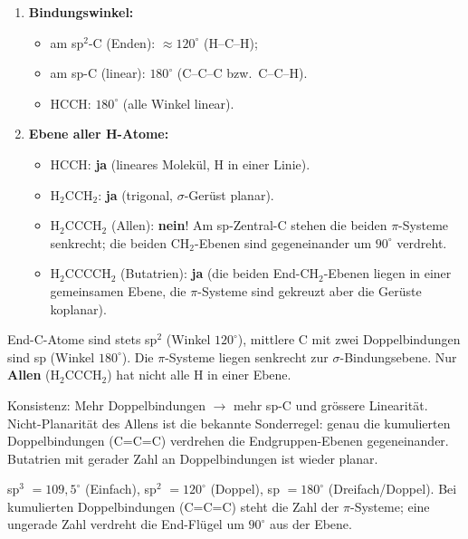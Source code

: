 \begin{enumerate}
  \item[d)] \textbf{Bindungswinkel:}
  \begin{itemize}
    \item am sp$^2$-C (Enden): $\approx 120^\circ$ (H--C--H);
    \item am sp-C (linear): $180^\circ$ (C--C--C bzw.\ C--C--H).
    \item $\mathrm{HCCH}$: $180^\circ$ (alle Winkel linear).
  \end{itemize}
  \item[e)] \textbf{Ebene aller H-Atome:}
  \begin{itemize}
    \item $\mathrm{HCCH}$: \textbf{ja} (lineares Molekül, H in einer Linie).
    \item $\mathrm{H_2CCH_2}$: \textbf{ja} (trigonal, $\sigma$-Gerüst
          planar).
    \item $\mathrm{H_2CCCH_2}$ (Allen): \textbf{nein}! Am sp-Zentral-C
          stehen die beiden $\pi$-Systeme senkrecht; die beiden
          $\mathrm{CH_2}$-Ebenen sind gegeneinander um $90^\circ$ verdreht.
    \item $\mathrm{H_2CCCCH_2}$ (Butatrien): \textbf{ja} (die beiden
          End-$\mathrm{CH_2}$-Ebenen liegen in einer gemeinsamen Ebene, die
          $\pi$-Systeme sind gekreuzt aber die Gerüste koplanar).
  \end{itemize}
\end{enumerate}

\begin{ergebnis}
End-C-Atome sind stets sp$^2$ (Winkel $120^\circ$), mittlere C mit zwei
Doppelbindungen sind sp (Winkel $180^\circ$). Die $\pi$-Systeme liegen
senkrecht zur $\sigma$-Bindungsebene. Nur \textbf{Allen}
($\mathrm{H_2CCCH_2}$) hat nicht alle H in einer Ebene.
\end{ergebnis}

\begin{kontrolle}
Konsistenz: Mehr Doppelbindungen $\rightarrow$ mehr sp-C und gr\"ossere
Linearität. Nicht-Planarität des Allens ist die bekannte Sonderregel:
genau die kumulierten Doppelbindungen (C=C=C) verdrehen die
Endgruppen-Ebenen gegeneinander. Butatrien mit gerader Zahl an
Doppelbindungen ist wieder planar.
\end{kontrolle}

\begin{merksatz}
sp$^3$ $= 109{,}5^\circ$ (Einfach), sp$^2$ $= 120^\circ$ (Doppel), sp $=
180^\circ$ (Dreifach/Doppel). Bei kumulierten Doppelbindungen (C=C=C)
steht die Zahl der $\pi$-Systeme; eine ungerade Zahl verdreht die
End-Flügel um $90^\circ$ aus der Ebene.
\end{merksatz}
